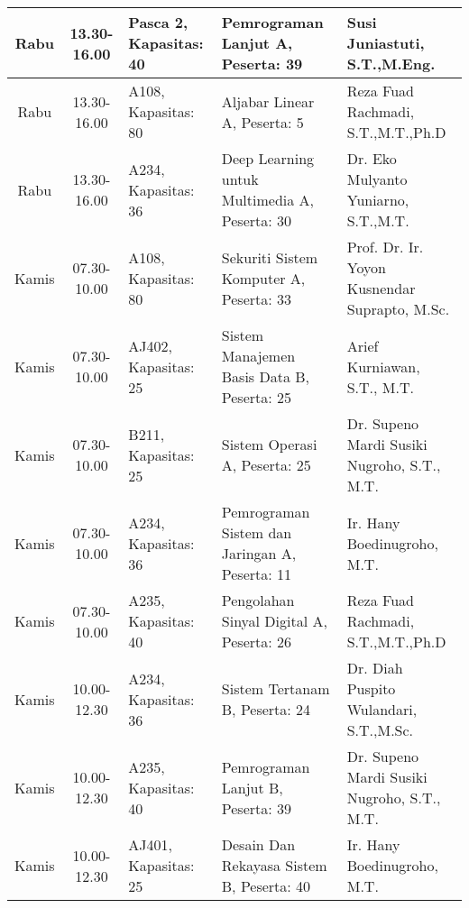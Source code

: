 \begin{longtable}[c]{|c|c|>{\centering\arraybackslash}m{2.5cm}|>{\centering\arraybackslash}m{4cm}|>{\centering\arraybackslash}m{3.2cm}|}
  Rabu   & 13.30-16.00 & Pasca 2, Kapasitas: 40 & Pemrograman Lanjut A, \linebreak Peserta: 39                        & Susi Juniastuti, S.T.,M.Eng.                  \\ \hline
  Rabu   & 13.30-16.00 & A108, Kapasitas: 80    & Aljabar Linear A, \linebreak Peserta: 5                             & Reza Fuad Rachmadi, S.T.,M.T.,Ph.D            \\ \hline
  Rabu   & 13.30-16.00 & A234, Kapasitas: 36    & Deep Learning untuk Multimedia A, \linebreak Peserta: 30            & Dr. Eko Mulyanto Yuniarno, S.T.,M.T.          \\ \hline
  Kamis  & 07.30-10.00 & A108, Kapasitas: 80    & Sekuriti Sistem Komputer A, \linebreak Peserta: 33                  & Prof. Dr. Ir. Yoyon Kusnendar Suprapto, M.Sc. \\ \hline
  Kamis  & 07.30-10.00 & AJ402, Kapasitas: 25   & Sistem Manajemen Basis Data B, \linebreak Peserta: 25               & Arief Kurniawan, S.T., M.T.                   \\ \hline
  Kamis  & 07.30-10.00 & B211, Kapasitas: 25    & Sistem Operasi A, \linebreak Peserta: 25                            & Dr. Supeno Mardi Susiki Nugroho, S.T., M.T.   \\ \hline
  Kamis  & 07.30-10.00 & A234, Kapasitas: 36    & Pemrograman Sistem dan Jaringan A, \linebreak Peserta: 11           & Ir. Hany Boedinugroho, M.T.                   \\ \hline
  Kamis  & 07.30-10.00 & A235, Kapasitas: 40    & Pengolahan Sinyal Digital A, \linebreak Peserta: 26                 & Reza Fuad Rachmadi, S.T.,M.T.,Ph.D            \\ \hline
  Kamis  & 10.00-12.30 & A234, Kapasitas: 36    & Sistem Tertanam B, \linebreak Peserta: 24                           & Dr. Diah Puspito Wulandari, S.T.,M.Sc.        \\ \hline
  Kamis  & 10.00-12.30 & A235, Kapasitas: 40    & Pemrograman Lanjut B, \linebreak Peserta: 39                        & Dr. Supeno Mardi Susiki Nugroho, S.T., M.T.   \\ \hline
  Kamis  & 10.00-12.30 & AJ401, Kapasitas: 25   & Desain Dan Rekayasa Sistem B, \linebreak Peserta: 40                & Ir. Hany Boedinugroho, M.T.                   \\ \hline

\end{longtable}
